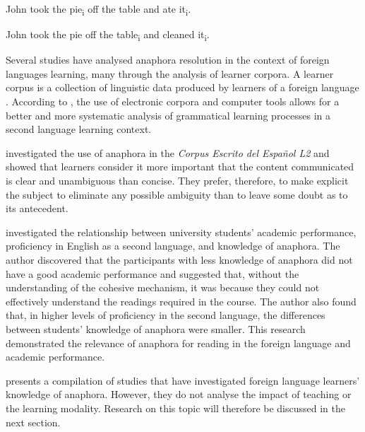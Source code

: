 \documentclass{textolivre}
\begin{document}
%
%
\begin{description}[topsep=1ex,partopsep=1ex]
  \item[(6a)\label{itm-6a}] John took the pie\textsubscript{i} off the table and ate it\textsubscript{i}.  
  \item[(6b)\label{itm-6b}] John took the pie off the table\textsubscript{i} and cleaned it\textsubscript{i}. 
\end{description}


Several studies have analysed anaphora resolution in the context of
foreign languages learning, many through the analysis of learner
corpora. A learner corpus is a collection of linguistic data
produced by learners of a foreign language \cite[p.~65]{mcenery_corpus_2006}.
According to \textcite[p.~288]{mitchell_second_2013}, the
use of electronic corpora and computer tools allows for a better
and more systematic analysis of grammatical learning processes in a
second language learning context.

\textcite{lozano_2016} investigated the use of anaphora in the \emph{Corpus
Escrito del Español L2} and showed that learners consider it more
important that the content communicated is clear and unambiguous than
concise. They prefer, therefore, to make explicit the subject to
eliminate any possible ambiguity than to leave some doubt as to its
antecedent.

\textcite{pretorius_english_2005} investigated the relationship between university
students' academic performance, proficiency in English as a second
language, and knowledge of anaphora. The author discovered that the
participants with less knowledge of anaphora did not have a good
academic performance and suggested that, without the understanding of
the cohesive mechanism, it was because they could not effectively
understand the readings required in the course. The author also found
that, in higher levels of proficiency in the second language, the
differences between students' knowledge of anaphora were smaller. This
research demonstrated the relevance of anaphora for reading in the
foreign language and academic performance.

\textcite[p.~608-9]{ellis_study_2008} presents a compilation of studies that have
investigated foreign language learners' knowledge of anaphora. However,
they do not analyse the impact of teaching or the learning modality.
Research on this topic will therefore be discussed in the next section.
\end{document}
